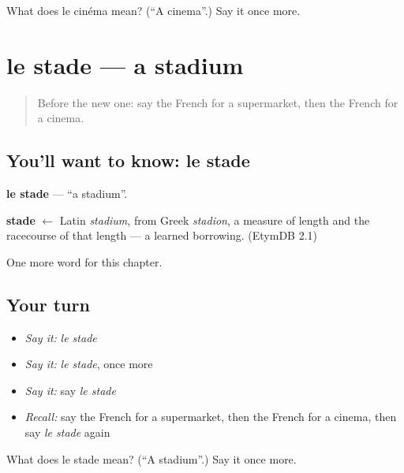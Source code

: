 \begin{tcolorbox}[breakable,colback=teal!4,colframe=teal!35!black,title={Before you move on}]
What does le cinéma mean? (\textquotedblleft{}A cinema\textquotedblright{}.) Say it once more.
\end{tcolorbox}
\section[le stade]{le stade — a stadium}

\label{lesson:FR-C107-stade}



\begin{quote}
Before the new one: say the French for a supermarket, then the French for a cinema.
\end{quote}

\subsection*{You'll want to know: le stade}
\textbf{le stade} — \textquotedblleft{}a stadium\textquotedblright{}.

\begin{cousinweb}
\textbf{stade} $\leftarrow$ Latin \emph{stadium}, from Greek \emph{stadion}, a measure of length and the racecourse of that length — a learned borrowing. (EtymDB 2.1)
\end{cousinweb}

\begin{grammarlens}[title={What you've built}]
One more word for this chapter.
\end{grammarlens}

\subsection*{Your turn}
\begin{itemize}
\raggedright
  \item \emph{Say it:} \emph{le stade}
  \item \emph{Say it:} \emph{le stade}, once more
  \item \emph{Say it:} say \emph{le stade}
  \item \emph{Recall:} say the French for a supermarket, then the French for a cinema, then say \emph{le stade} again
\end{itemize}

\begin{tcolorbox}[breakable,colback=teal!4,colframe=teal!35!black,title={Before you move on}]
What does le stade mean? (\textquotedblleft{}A stadium\textquotedblright{}.) Say it once more.
\end{tcolorbox}
